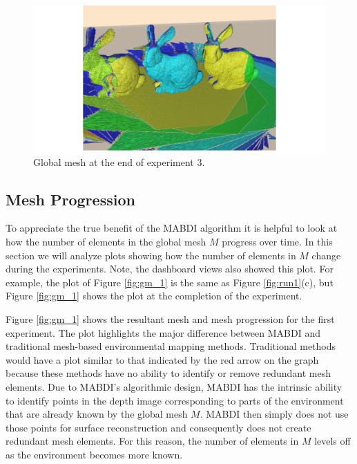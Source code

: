\begin{figure}[h]%
\centering
  \includegraphics[width=\textwidth]{figures/run3_global_mesh.png}
  \caption{Global mesh at the end of experiment 3.}
  \label{fig:gm_3_full}
\end{figure}

\subsection{Mesh Progression}

To appreciate the true benefit of the MABDI algorithm it is helpful to look at
how the number of elements in the global mesh $M$ progress over time. In this
section we will analyze plots showing how the number of elements in $M$ change
during the experiments. Note, the dashboard views also showed this plot. For
example, the plot of Figure \ref{fig:gm_1} is the same as Figure
\ref{fig:run1}(c), but Figure \ref{fig:gm_1} shows the plot at the completion of
the experiment.

Figure \ref{fig:gm_1} shows the resultant mesh and mesh progression for the
first experiment. The plot highlights the major difference between MABDI
and traditional mesh-based environmental mapping methods. Traditional methods
would have a plot similar to that indicated by the red arrow on the graph
because these methods have no ability to identify or remove redundant mesh
elements. Due to MABDI's algorithmic design, MABDI has the intrinsic ability to
identify points in the depth image corresponding to parts of the environment
that are already known by the global mesh $M$. MABDI then simply does not use
those points for surface reconstruction and consequently does not create
redundant mesh elements. For this reason, the number of elements in $M$ levels
off as the environment becomes more known.


